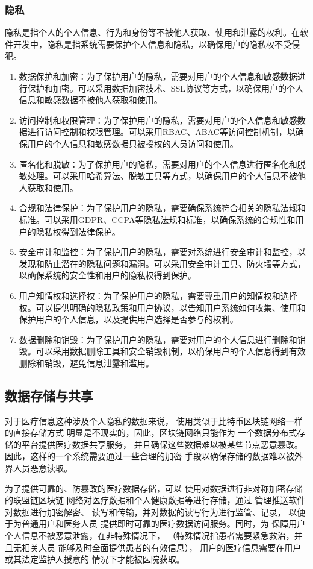 \documentclass[UTF8]{ctexart}
\newcommand{\ch}[1]{\textcolor{ChatGPT}{#1}}
\newcommand{\m}[1]{\textcolor{modify}{#1}}
\begin{document}
    \subsubsection{隐私}
    \ch{隐私是指个人的个人信息、行为和身份等不被他人获取、使用和泄露的权利。在软件开发中，隐私是指系统需要保护个人信息和隐私，以确保用户的隐私权不受侵犯}。
    \m{
        \begin{enumerate}
            \item 数据保护和加密：为了保护用户的隐私，需要对用户的个人信息和敏感数据进行保护和加密。可以采用数据加密技术、SSL协议等方式，以确保用户的个人信息和敏感数据不被他人获取和使用。
            \item 访问控制和权限管理：为了保护用户的隐私，需要对用户的个人信息和敏感数据进行访问控制和权限管理。可以采用RBAC、ABAC等访问控制机制，以确保用户的个人信息和敏感数据只被授权的人员访问和使用。
            \item 匿名化和脱敏：为了保护用户的隐私，需要对用户的个人信息进行匿名化和脱敏处理。可以采用哈希算法、脱敏工具等方式，以确保用户的个人信息不被他人获取和使用。
            \item 合规和法律保护：为了保护用户的隐私，需要确保系统符合相关的隐私法规和标准。可以采用GDPR、CCPA等隐私法规和标准，以确保系统的合规性和用户的隐私权得到法律保护。
            \item 安全审计和监控：为了保护用户的隐私，需要对系统进行安全审计和监控，以发现和防止潜在的隐私问题和漏洞。可以采用安全审计工具、防火墙等方式，以确保系统的安全性和用户的隐私权得到保护。
            \item 用户知情权和选择权：为了保护用户的隐私，需要尊重用户的知情权和选择权。可以提供明确的隐私政策和用户协议，以告知用户系统如何收集、使用和保护用户的个人信息，以及提供用户选择是否参与的权利。
            \item 数据删除和销毁：为了保护用户的隐私，需要对用户的个人信息进行删除和销毁。可以采用数据删除工具和安全销毁机制，以确保用户的个人信息得到有效删除和销毁，避免信息泄露和滥用。
        \end{enumerate}
    }

    \subsection{数据存储与共享}
    \par
    对于医疗信息这种涉及个人隐私的数据来说，
    使用类似于比特币区块链网络一样的直接存储方式
    明显是不现实的，因此，区块链网络只能作为
    一个数据分布式存储的平台提供医疗数据共享服务，
    并且确保这些数据难以被某些节点恶意篡改。
    因此，这样的一个系统需要通过一些合理的加密
    手段以确保存储的数据难以被外界人员恶意读取。
    \par
    为了提供可靠的、防篡改的医疗数据存储，可以
    使用对数据进行非对称加密存储的联盟链区块链
    网络对医疗数据和个人健康数据等进行存储，通过
    管理推送软件对数据进行加密解密、
    读写和传输，并对数据的读写行为进行监管、记录，
    以便于为普通用户和医务人员
    提供即时可靠的医疗数据访问服务。同时，为
    保障用户个人信息不被恶意泄露，在非特殊情况下，
    （特殊情况指患者需要紧急救治，并且无相关人员
    能够及时全面提供患者的有效信息），
    用户的医疗信息需要在用户或其法定监护人授意的
    情况下才能被医院获取。
\end{document}
